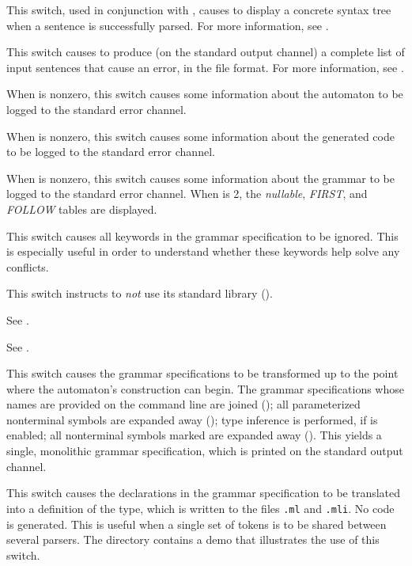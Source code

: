 \documentclass[onecolumn,11pt,nocopyrightspace,preprint]{sigplanconf}
\begin{document}
\docswitch{\ointerpretshowcst} This switch, used in conjunction with \ointerpret,
causes \menhir to display a concrete syntax tree when a sentence is successfully
parsed. For more information, see .

\docswitch{\olisterrors} This switch causes \menhir to produce (on the standard
output channel) a complete list of input sentences that cause an error, in the
\messages file format. For more information, see .

 When  is nonzero, this switch
causes some information about the automaton to be logged to the standard error
channel.

 When  is nonzero, this switch
causes some information about the generated \ocaml code to be logged to the
standard error channel.

 When  is nonzero, this switch
causes some information about the grammar to be logged to the standard error
channel. When  is 2, the \emph{nullable}, \emph{FIRST}, and
\emph{FOLLOW} tables are displayed.

\docswitch{\onoinline} This switch causes all \dinline keywords in the
grammar specification to be ignored. This is especially useful in order
to understand whether these keywords help solve any conflicts.

\docswitch{\onostdlib} This switch instructs \menhir to \emph{not} use
its standard library ().

 See .

 See .

\docswitch{\oonlypreprocess} This switch causes the grammar specifications
to be transformed up to the point where the automaton's construction can
begin. The grammar specifications whose names are provided on the command line
are joined (); all parameterized nonterminal symbols are
expanded away (); type inference is performed, if \oinfer
is enabled; all nonterminal symbols marked \dinline are expanded away
(). This yields a single, monolithic grammar specification,
which is printed on the standard output channel.

\docswitch{\oonlytokens} This switch causes the \dtoken declarations in
the grammar specification to be translated into a definition of the \token
type, which is written to the files \texttt{.ml} and
\texttt{.mli}. No code is generated. This is useful when
a single set of tokens is to be shared between several parsers. The directory
 contains a demo that illustrates the use of this switch.
\end{document}
